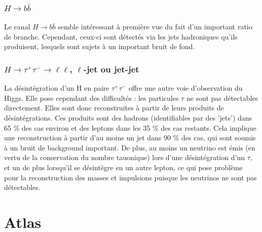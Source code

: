 \documentclass[11pt]{article} %
\begin{document}
\subsubsection{$H \to b\bar{b}$}

Le canal $H \to b\bar{b}$ semble intéressant à première vue du fait d'un important ratio de branche. Cependant, ceux-ci sont détectés via les jets hadroniques qu'ils produisent, lesquels sont sujets à un important bruit de fond.

\subsubsection{$H \to \tau^+\tau^- \to \ell\ell$, $\ell$-jet ou jet-jet}

La désintégration d'un H en paire $\tau^+ \tau^-$ offre une autre voie d'observation du Higgs. Elle pose cependant des difficultés : les particules $\tau$ ne sont pas détectables directement. Elles sont donc reconstruites à partir de leurs produits de désintégrations. Ces produits sont des hadrons (identifiables par des 'jets') dans 65 \% des cas environ et des leptons dans les 35 \% des cas restants. Cela implique une reconstruction à partir d'au moins un jet dans 90  \% des cas, qui sont soumis à un bruit de  background important. De plus, au moins un neutrino est émis (en vertu de la conservation du nombre tauonique) lors d'une désintégration d'un $\tau$, et un de plus lorsqu'il se désintègre en un autre lepton, ce qui pose problème pour la reconstruction des masses et impulsions puisque les neutrinos ne sont pas détectables.



%




\section{Atlas}
\end{document}
